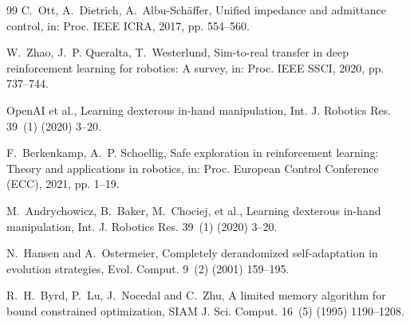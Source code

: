 \documentclass[DTMColor]{ROB-New}
\begin{document}
\begin{thebibliography}{99}
C.~Ott, A.~Dietrich, A.~Albu-Schäffer, Unified impedance and admittance control, in: Proc. IEEE ICRA, 2017, pp. 554--560.

W.~Zhao, J.~P. Queralta, T.~Westerlund, Sim-to-real transfer in deep reinforcement learning for robotics: A survey, in: Proc. IEEE SSCI, 2020, pp. 737--744.

OpenAI et al., Learning dexterous in-hand manipulation, Int. J. Robotics Res. 39~(1) (2020) 3--20.

F.~Berkenkamp, A.~P. Schoellig, Safe exploration in reinforcement learning: Theory and applications in robotics, in: Proc. European Control Conference (ECC), 2021, pp. 1--19.

M.~Andrychowicz, B.~Baker, M.~Chociej, et al., Learning dexterous in-hand manipulation, Int. J. Robotics Res. 39~(1) (2020) 3--20.

N.~Hansen and A.~Ostermeier, Completely derandomized self-adaptation in evolution strategies, Evol. Comput. 9~(2) (2001) 159--195.

R.~H.~Byrd, P.~Lu, J.~Nocedal and C.~Zhu, A limited memory algorithm for bound constrained optimization, SIAM J. Sci. Comput. 16~(5) (1995) 1190--1208.

\end{thebibliography}
\end{document}
